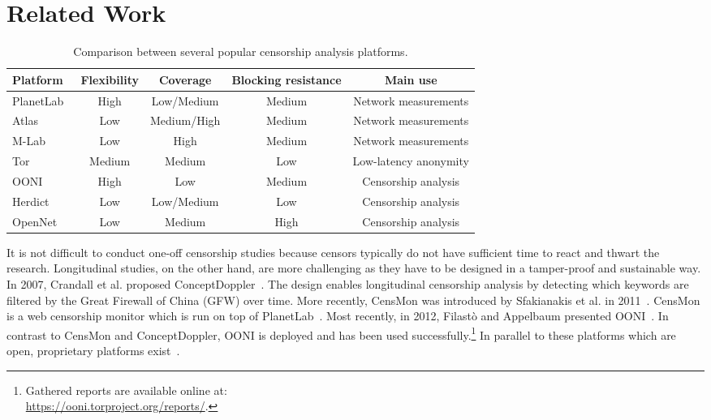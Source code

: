 \section{Related Work}
\label{related_work}
\begin{table*}[ht!]
\centering
\begin{tabular}{l|cccc}
\textbf{Platform} & \textbf{Flexibility} & \textbf{Coverage} &
\textbf{Blocking resistance} & \textbf{Main use} \\
\hline 
PlanetLab~\cite{planetlab} & High & Low/Medium & Medium & Network measurements \\
Atlas~\cite{atlas} & Low & Medium/High & Medium & Network measurements \\
M-Lab~\cite{dovrolis2010measurement} & Low & High & Medium & Network measurements \\
Tor~\cite{Dingledine2004} & Medium & Medium & Low & Low-latency anonymity \\
OONI~\cite{Filasto2012} & High & Low & Medium & Censorship analysis \\
Herdict~\cite{Herdict} & Low & Low/Medium & Low & Censorship analysis \\
OpenNet~\cite{opennet} & Low & Medium & High & Censorship analysis \\
\hline 
\end{tabular} 
\caption{Comparison between several popular censorship analysis platforms.}
\label{tab:comparison}
\end{table*}

It is not difficult to conduct one-off censorship studies because censors
typically do not have sufficient time to react and thwart the research.
Longitudinal studies, on the other hand, are more challenging as they have to
be designed in a tamper-proof and sustainable way.  In 2007, Crandall et al.
proposed ConceptDoppler~\cite{Crandall2007}.  The design enables longitudinal
censorship analysis by detecting which keywords are filtered by the Great
Firewall of China (GFW) over time.  More recently, CensMon was introduced by
Sfakianakis et al. in 2011~\cite{Sfakianakis2011}.  CensMon is a web censorship
monitor which is run on top of PlanetLab~\cite{planetlab}.  Most recently, in
2012, Filast\`{o} and Appelbaum presented OONI~\cite{Filasto2012}.  In
contrast to CensMon and ConceptDoppler, OONI is deployed and has been used
successfully.\footnote{Gathered reports are available online at:\\
\url{https://ooni.torproject.org/reports/}.}  In parallel to these platforms
which are open, proprietary platforms exist~\cite{hwang2007herdict,opennet}.

